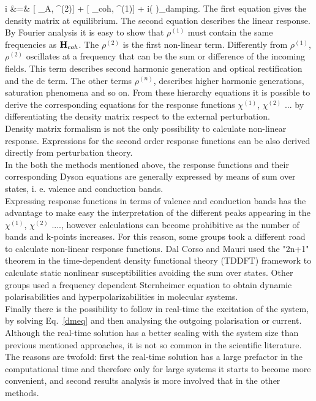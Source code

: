 i \hbar {} &=& [ \HH_A, \rho^{(2)}] + [ \HH_{coh}, \rho^{(1)}] + i\hbar \left (  \right )_{damping}. 
\eea
The first equation gives the density matrix at equilibrium. The second equation describes the linear response. By Fourier analysis it is easy to show that $\rho^{(1)}$ must contain the same frequencies as ${\bf H}_{coh}$. The $\rho^{(2)}$  is the first non-linear term. Differently from $\rho^{(1)}$,  $\rho^{(2)}$ oscillates at a frequency that can be the sum or difference of the incoming fields. This term describes second harmonic generation and optical rectification and the dc term. The other terms   $\rho^{(n)}$, describes higher harmonic generations, saturation phenomena and so on.
From these hierarchy equations it is possible to derive the corresponding equations for the response functions $\chi^{(1)}$, $\chi^{(2)}$ ... by differentiating the density matrix respect to the external perturbation. \\
Density matrix formalism is not the only possibility to calculate non-linear response. Expressions for the second order response functions can be also derived directly from perturbation theory.\cite{PhysRevB.56.1787,PhysRevB.42.3567,PhysRevB.82.235201} \\
In the both the methods mentioned above, the response functions and their corresponding Dyson equations are generally expressed by means of sum over states, i. e. valence and conduction bands.\\
Expressing response functions in terms of valence and conduction bands has the advantage to make easy the interpretation of the different peaks appearing in the  $\chi^{(1)}$, $\chi^{(2)}$ ...., however calculations can become prohibitive as the number of bands and k-points increases. For this reason, some groups took a different road to calculate non-linear response functions. Dal Corso and Mauri used the "2n+1" theorem in the time-dependent density functional theory (TDDFT) framework to calculate static nonlinear susceptibilities avoiding the sum over states.\cite{PhysRevB.50.5756}
Other groups used a frequency dependent Sternheimer equation to obtain dynamic polarisabilities and hyperpolarizabilities in molecular systems.\cite{andrade2007time} \\
Finally there is the possibility to follow in real-time the excitation of the system, by solving Eq.~\ref{dmeq} and then analysing the outgoing polarisation or current. Although the real-time solution has a better scaling  with the system size  than  previous mentioned approaches, it is not so common in the scientific literature. The reasons are twofold: first the real-time solution has a large prefactor in the computational time  and therefore only for large systems it starts to become more convenient, and second results analysis is more involved that in the other methods. \\ 
